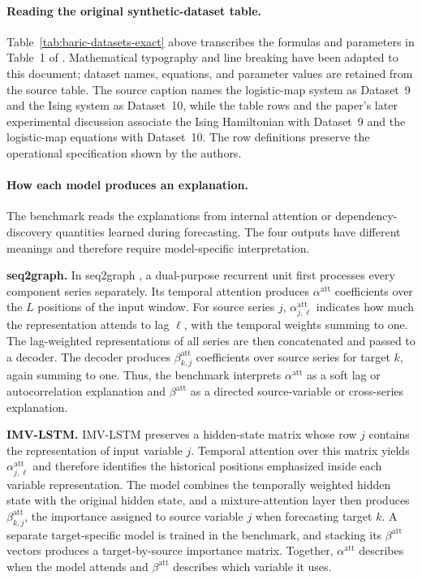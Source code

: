 \paragraph{Reading the original synthetic-dataset table.}
Table~\ref{tab:baric-datasets-exact} above transcribes the formulas and
parameters in Table~1 of \citet{baric2021benchmarking}. Mathematical typography
and line breaking have been adapted to this document; dataset names, equations,
and parameter values are retained from the source table. The source caption
names the logistic-map system as Dataset~9 and the Ising system as Dataset~10,
while the table rows and the paper's later experimental discussion associate
the Ising Hamiltonian with Dataset~9 and the logistic-map equations with
Dataset~10. The row definitions preserve the operational specification shown
by the authors.

\paragraph{How each model produces an explanation.}
The benchmark reads the explanations from internal attention or
dependency-discovery quantities learned during forecasting. The four outputs
have different meanings and therefore require model-specific interpretation.

\textbf{seq2graph.}
In seq2graph \citep{dang2018seq2graph}, a dual-purpose recurrent unit first
processes every component series separately. Its temporal attention produces
$\alpha^{\mathrm{att}}$ coefficients over the $L$ positions of the input
window. For source series $j$, $\alpha^{\mathrm{att}}_{j,\ell}$ indicates how much the representation attends to
lag $\ell$, with the temporal weights summing to one. The lag-weighted
representations of all series are then concatenated and passed to a decoder.
The decoder produces $\beta^{\mathrm{att}}_{k,j}$ coefficients over source
series for target $k$, again summing to one. Thus, the benchmark interprets
$\alpha^{\mathrm{att}}$ as a soft lag or autocorrelation explanation and
$\beta^{\mathrm{att}}$ as a directed source-variable or cross-series
explanation.

\textbf{IMV-LSTM.}
IMV-LSTM \citep{guo2019imvlstm} preserves a hidden-state matrix whose row $j$
contains the representation of input variable $j$. Temporal attention over
this matrix yields $\alpha^{\mathrm{att}}_{j,\ell}$ and therefore identifies the historical
positions emphasized inside each variable representation. The model combines
the temporally weighted hidden state with the original hidden state, and a
mixture-attention layer then produces $\beta^{\mathrm{att}}_{k,j}$, the
importance assigned to source variable $j$
when forecasting target $k$. A separate target-specific model is trained in
the benchmark, and stacking its $\beta^{\mathrm{att}}$ vectors produces a
target-by-source importance matrix. Together, $\alpha^{\mathrm{att}}$
describes when the model attends and $\beta^{\mathrm{att}}$ describes which
variable it uses.

